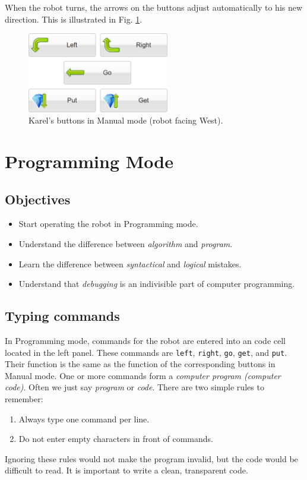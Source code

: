 \documentclass[article,A4,12pt]{llncs}
\begin{document}
When the robot turns, the arrows on the buttons adjust automatically to his new 
direction. This is illustrated in Fig. \ref{fig:buttons2}.

\begin{figure}[!ht]
\begin{center}
\includegraphics[width=6.2cm]{img/buttons-all-2.png}
\vspace{-0mm}
\caption{Karel's buttons in Manual mode (robot facing West).}
\label{fig:buttons2}
\end{center}
\end{figure}


\section{Programming Mode} \label{sec:bridge}

\subsection{Objectives} 
 
\begin{itemize}
\item Start operating the robot in Programming mode.
\item Understand the difference between {\em algorithm} and {\em program}. 
\item Learn the difference between {\em syntactical} and {\em logical} mistakes.
\item Understand that {\em debugging} is an indivisible part of computer programming.
\end{itemize}

\subsection{Typing commands}
In Programming mode, commands for the robot are entered into an code cell located in the left panel.
These commands are {\tt left}, {\tt right}, {\tt go}, {\tt get}, and {\tt put}.
Their function is the same as the function of the corresponding buttons in Manual mode.
One or more commands form a {\em computer program (computer code)}. Often 
we just say {\em program} or {\em code}.
There are two simple rules to remember:
\begin{enumerate}
\item Always type one command per line.
\item Do not enter empty characters in front of commands. 
\end{enumerate}
Ignoring these rules would not make the program invalid, but the code would be 
difficult to read. It is important to write a clean, transparent code. 
\end{document}
